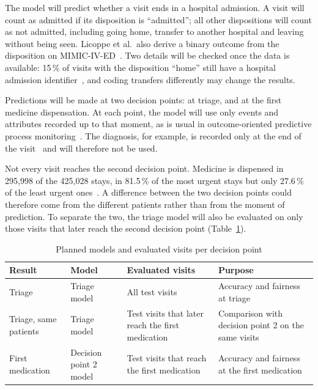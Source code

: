 The model will predict whether a visit ends in a hospital admission. A visit will count as admitted if its disposition is ``admitted''; all other dispositions will count as not admitted, including going home, transfer to another hospital and leaving without being seen. Licoppe et al.\ also derive a binary outcome from the disposition on MIMIC-IV-ED~\cite{licoppe2026assessing}. Two details will be checked once the data is available: 15\,\% of visits with the disposition ``home'' still have a hospital admission identifier~\cite{wei2025curation}, and coding transfers differently may change the results.

Predictions will be made at two decision points: at triage, and at the first medicine dispensation. At each point, the model will use only events and attributes recorded up to that moment, as is usual in outcome-oriented predictive process monitoring~\cite{teinemaa2019outcome}. The diagnosis, for example, is recorded only at the end of the visit~\cite{wei2025curation} and will therefore not be used.

Not every visit reaches the second decision point. Medicine is dispensed in 295,998 of the 425,028 stays, in 81.5\,\% of the most urgent stays but only 27.6\,\% of the least urgent ones~\cite{wei2025curation}. A difference between the two decision points could therefore come from the different patients rather than from the moment of prediction. To separate the two, the triage model will also be evaluated on only those visits that later reach the second decision point (Table~\ref{table::evaluation_plan}).

\begin{table}[htbp]
  \centering
  \footnotesize
  \caption{Planned models and evaluated visits per decision point}\label{table::evaluation_plan}
  \begin{tabularx}{\textwidth}{@{}>{\raggedright\arraybackslash}p{2.8cm}>{\raggedright\arraybackslash}p{2.8cm}>{\raggedright\arraybackslash}X>{\raggedright\arraybackslash}X@{}}
    \toprule
    \textbf{Result} & \textbf{Model} & \textbf{Evaluated visits} & \textbf{Purpose} \\
    \midrule
    Triage & Triage model & All test visits & Accuracy and fairness at triage \\
    Triage, same patients & Triage model & Test visits that later reach the first medication & Comparison with decision point 2 on the same visits \\
    First medication & Decision point 2 model & Test visits that reach the first medication & Accuracy and fairness at the first medication \\
    \bottomrule
  \end{tabularx}
\end{table}

